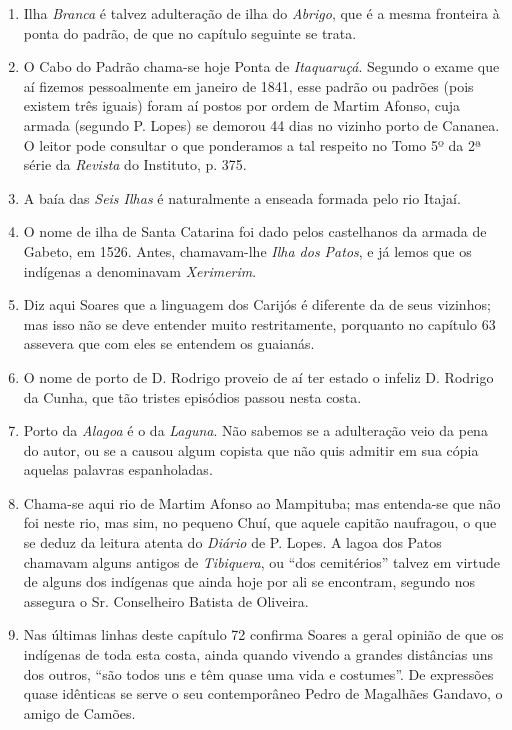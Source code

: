 \begin{enumerate}
\item Ilha \textit{Branca} é talvez adulteração de ilha do \textit{Abrigo}, que é a mesma fronteira à ponta 
do padrão, de que no capítulo seguinte se trata.

\item O Cabo do Padrão chama-se hoje Ponta de \textit{Itaquaruçá}. Segundo o exame que aí 
fizemos pessoalmente em janeiro de 1841, esse padrão ou padrões (pois existem três 
iguais) foram aí postos por ordem de Martim Afonso, cuja armada (segundo P. Lopes) 
se demorou 44 dias no vizinho porto de Cananea. O leitor pode consultar o que 
ponderamos a tal respeito no Tomo 5º da 2ª série da \textit{Revista} do Instituto, p. 375.

\item A baía das \textit{Seis Ilhas} é naturalmente a enseada formada pelo rio Itajaí.

\item O nome de ilha de Santa Catarina foi dado pelos castelhanos da armada de Gabeto, 
em 1526. Antes, chamavam-lhe \textit{Ilha dos Patos}, e já lemos que os indígenas a 
denominavam \textit{Xerimerim}.

\item Diz aqui Soares que a linguagem dos Carijós é diferente da de seus vizinhos; mas 
isso não se deve entender muito restritamente, porquanto no capítulo 63 assevera que 
com eles se entendem os guaianás.

\item O nome de porto de D. Rodrigo proveio de aí ter estado o infeliz D. Rodrigo da 
Cunha, que tão tristes episódios passou nesta costa.

\item Porto da \textit{Alagoa} é o da \textit{Laguna}. Não sabemos se a adulteração veio da pena do 
autor, ou se a causou algum copista que não quis admitir em sua cópia aquelas palavras 
espanholadas.

\item Chama-se aqui rio de Martim Afonso ao Mampituba; mas entenda-se que não foi 
neste rio, mas sim, no pequeno Chuí, que aquele capitão naufragou, o que se deduz da 
leitura atenta do \textit{Diário} de P. Lopes. A lagoa dos Patos chamavam alguns antigos de  
\textit{Tibiquera},  ou ``dos cemitérios''  talvez em virtude de alguns dos indígenas que ainda 
hoje por ali se encontram, segundo nos assegura o Sr. Conselheiro Batista de Oliveira.

\item Nas últimas linhas deste capítulo 72 confirma Soares a geral opinião de que os 
indígenas de toda esta costa, ainda quando vivendo a grandes distâncias uns dos outros, 
``são todos uns e têm quase uma vida e costumes''.  De expressões quase idênticas se 
serve o seu contemporâneo Pedro de Magalhães Gandavo, o amigo de Camões.


\end{enumerate}
